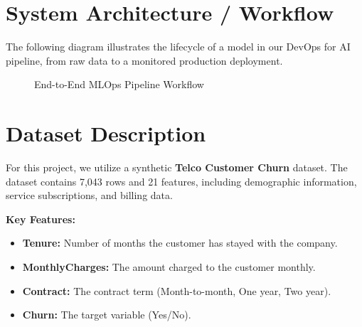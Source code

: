 \documentclass[12pt,a4paper]{article}
\begin{document}
\section{System Architecture / Workflow}
The following diagram illustrates the lifecycle of a model in our DevOps for AI pipeline, from raw data to a monitored production deployment.

\begin{figure}[H]
    \centering
    \caption{End-to-End MLOps Pipeline Workflow}
\end{figure}

\section{Dataset Description}
For this project, we utilize a synthetic \textbf{Telco Customer Churn} dataset. The dataset contains 7,043 rows and 21 features, including demographic information, service subscriptions, and billing data.

\textbf{Key Features:}
\begin{itemize}
    \item \textbf{Tenure:} Number of months the customer has stayed with the company.
    \item \textbf{MonthlyCharges:} The amount charged to the customer monthly.
    \item \textbf{Contract:} The contract term (Month-to-month, One year, Two year).
    \item \textbf{Churn:} The target variable (Yes/No).
\end{itemize}
\end{document}
